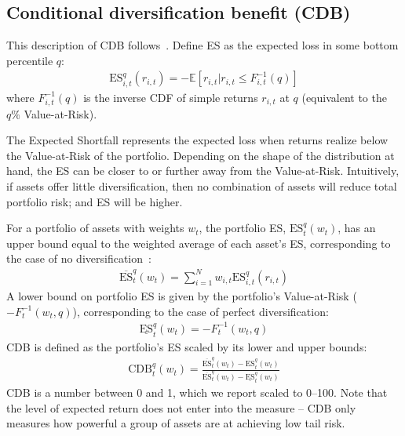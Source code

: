 
\subsection{Conditional diversification benefit (CDB)} %
\label{sub:conditional_diversification_benefit}

This description of CDB follows~\textcite{ChristoffersenErrunzaJacobLanglois2012}. Define ES as the expected loss in some bottom percentile $q$:
\begin{align}
    \text{ES}_{i,t}^q(r_{i,t}) = -\mathbb{E}[r_{i,t} | r_{i,t} \leq F_{i,t}^{-1}(q)]
\end{align}
where $F_{i,t}^{-1}(q)$ is the inverse CDF of simple returns $r_{i,t}$ at $q$ (equivalent to the $q\%$ Value-at-Risk). 

The Expected Shortfall represents the expected loss when returns realize below the Value-at-Risk of the portfolio. Depending on the shape of the distribution at hand, the ES can be closer to or further away from the Value-at-Risk. Intuitively, if assets offer little diversification, then no combination of assets will reduce total portfolio risk; and ES will be higher. 

For a portfolio of assets with weights $w_t$, the portfolio ES, $\text{ES}_t^q(w_t)$, has an upper bound equal to the weighted average of each asset's ES, corresponding to the case of no diversification~\autocite{Artzner1999}:
\begin{align}
  \overline{\text{ES}}_t^q(w_t) = \sum_{i=1}^N w_{i,t} \text{ES}_{i,t}^q(r_{i,t})
\end{align}
A lower bound on portfolio ES is given by the portfolio's Value-at-Risk ($-F_{t}^{-1}(w_t, q)$), corresponding to the case of perfect diversification:
\begin{align}
  \underline{\text{ES}}_t^q(w_t) = -F_{t}^{-1}(w_t, q)
\end{align}
CDB is defined as the portfolio's ES scaled by its lower and upper bounds:
\begin{align}
  \text{CDB}_t^q(w_t) = \frac{\overline{\text{ES}}_t^q(w_t) - \text{ES}_t^q(w_t)}{\overline{\text{ES}}_t^q(w_t) - \underline{\text{ES}}_t^q(w_t)}
\end{align}
CDB is a number between 0 and 1, which we report scaled to 0--100. Note that the level of expected return does not enter into the measure -- CDB only measures how powerful a group of assets are at achieving low tail risk.

